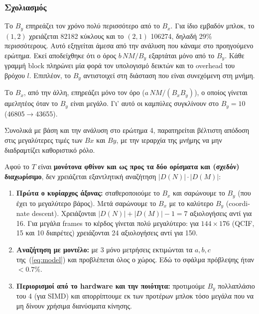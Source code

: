 \documentclass[11pt,a4paper]{article}
\newcommand{\en}[1]{\foreignlanguage{english}{#1}}
\begin{document}
\subsubsection*{Σχολιασμός}
Το $B_y$ επηρεάζει τον χρόνο πολύ περισσότερο από το $B_x$. Για ίδιο εμβαδόν μπλοκ,
το $(1,2)$ χρειάζεται \num{82182} κύκλους και το $(2,1)$ \num{106274}, δηλαδή 29\% περισσότερους.
Αυτό εξηγείται άμεσα από την ανάλυση που κάναμε στο προηγούμενο ερώτημα. Εκεί αποδείχθηκε ότι ο όρος $b\,NM/B_y$ εξαρτάται μόνο από το $B_y$. Κάθε γραμμή block πληρώνει μία φορά τον
υπολογισμό δεικτών και το \en{overhead} του βρόχου $l$. Επιπλέον, το $B_y$ αντιστοιχεί στη διάσταση
που είναι συνεχόμενη στη μνήμη.

Το $B_x$, από την άλλη, επηρεάζει μόνο τον όρο ($a\,NM/(B_xB_y)$), ο οποίος γίνεται αμελητέος όταν το
$B_y$ είναι μεγάλο. Γι' αυτό οι καμπύλες συγκλίνουν στο $B_y=10$ (\num{46805}$\to$\num{43655}).

Συνολικά με βάση και την ανάλυση στο ερώτημα 4, παρατηρείται βέλτιστη απόδοση στις μεγαλύτερες τιμές των $Bx$ και $By$, με την ιεραρχία της μνήμης να μην διαδραμτίζει καθοριστικό ρόλο.

\begin{insight}
Αφού το $T$ είναι \textbf{μονότονα φθίνον και ως προς τα δύο ορίσματα και (σχεδόν) διαχωρίσιμο}, δεν
χρειάζεται εξαντλητική αναζήτηση $|D(N)|\cdot|D(M)|$:
\begin{enumerate}[leftmargin=*]
  \item \textbf{Πρώτα ο κυρίαρχος άξονας:} σταθεροποιούμε το $B_x$ και σαρώνουμε το $B_y$ (που έχει το
  μεγαλύτερο βάρος). Μετά σαρώνουμε το $B_x$ με το καλύτερο $B_y$ (\en{coordinate descent}). Χρειάζονται
  $|D(N)|+|D(M)|-1=7$ αξιολογήσεις αντί για 16. Για μεγάλα \en{frames} το κέρδος γίνεται πολύ μεγαλύτερο: για $144\times176$ (QCIF, 15 και 10 διαιρέτες)
  χρειάζονται 24 αξιολογήσεις αντί για 150.
  \item \textbf{Αναζήτηση με μοντέλο:} με 3 μόνο μετρήσεις εκτιμώνται τα $a,b,c$ της~(\ref{eq:model}) και
  προβλέπεται όλος ο χώρος. Εδώ το σφάλμα πρόβλεψης ήταν $<0.7\%$.
  \item \textbf{Περιορισμοί από το \en{hardware} και την ποιότητα:} προτιμούμε $B_y$ πολλαπλάσιο του 4 (για
  SIMD) και απορρίπτουμε εκ των προτέρων μπλοκ τόσο μεγάλα που να μη δίνουν χρήσιμα διανύσματα κίνησης.
\end{enumerate}
\end{insight}

\newpage
\end{document}

